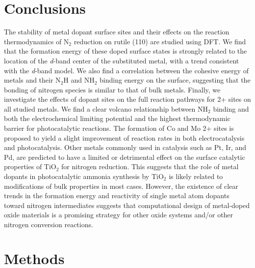 \section{Conclusions}
The stability of metal dopant surface sites and their effects on the reaction thermodynamics of N$_2$ reduction on rutile (110) are studied using DFT. We find that the formation energy of these doped surface states is strongly related to the location of the \textit{d}-band center of the substituted metal, with a trend consistent with the \textit{d}-band model. We also find a correlation between the cohesive energy of metals and their N$_2$H and NH$_2$ binding energy on the surface, suggesting that the bonding of nitrogen species is similar to that of bulk metals. Finally, we investigate the effects of dopant sites on the full reaction pathways for 2+ sites on all studied metals. We find a clear volcano relationship between NH$_2$ binding and both the electrochemical limiting potential and the highest thermodynamic barrier for photocatalytic reactions. The formation of Co and Mo 2+ sites is proposed to yield a slight improvement of reaction rates in both electrocatalysis and photocatalysis. Other metals commonly used in catalysis such as Pt, Ir, and Pd, are predicted to have a limited or detrimental effect on the surface catalytic properties of TiO$_2$ for nitrogen reduction. This suggests that the role of metal dopants in photocatalytic ammonia synthesis by TiO$_2$ is likely related to modifications of bulk properties in most cases. However, the existence of clear trends in the formation energy and reactivity of single metal atom dopants toward nitrogen intermediates suggests that computational design of metal-doped oxide materials is a promising strategy for other oxide systems and/or other nitrogen conversion reactions.




\section{Methods}
\label{sec:methods}

